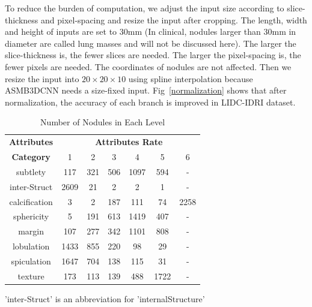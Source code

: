 \documentclass{article}
\begin{document}
To reduce the burden of computation, we adjust the input size according to slice-thickness and pixel-spacing and resize the input after cropping. The length, width and height of inputs are set to 30mm (In clinical, nodules larger than 30mm in diameter are called lung masses and will not be discussed here). The larger the slice-thickness is, the fewer slices are needed. The larger the pixel-spacing is, the fewer pixels are needed. The coordinates of nodules are not affected.
Then we resize the input into $20\times20\times10$ using spline interpolation because ASMB3DCNN needs a size-fixed input. Fig~\ref{normalization} shows that after normalization, the accuracy of each branch is improved in LIDC-IDRI dataset.
\vspace{-0.3cm}
\begin{table}[htbp]
\setlength{\abovecaptionskip}{0.cm}
\setlength{\belowcaptionskip}{-0.cm}
\caption{Number of  Nodules in Each Level}
\begin{center}
\begin{tabular}{|c|c|c|c|c|c|c|}
\hline
\textbf{Attributes}&\multicolumn{6}{|c|}{\textbf{Attributes Rate}} \\
\cline{2-7}
\textbf{Category}& 1&2&3&4&5&6\\
\hline
subtlety&117&321&506&1097&594&-\\
inter-Struct&2609&21&2&2&1&-\\
calcification&3&2&187&111&74&2258\\
sphericity&5&191&613&1419&407& -\\
margin& 107&277&342&1101&808& - \\
lobulation&1433&855&220&98&29& - \\
spiculation&1647&704&138&115&31& - \\
texture&173&113&139&488&1722& - \\
\hline
\end{tabular}
\vspace{-0.4cm}
\label{tab3}
\footnotesize{'inter-Struct' is an abbreviation for  'internalStructure'}\\
\end{center}
\end{table}

\vspace{-0.7cm}
\end{document}
